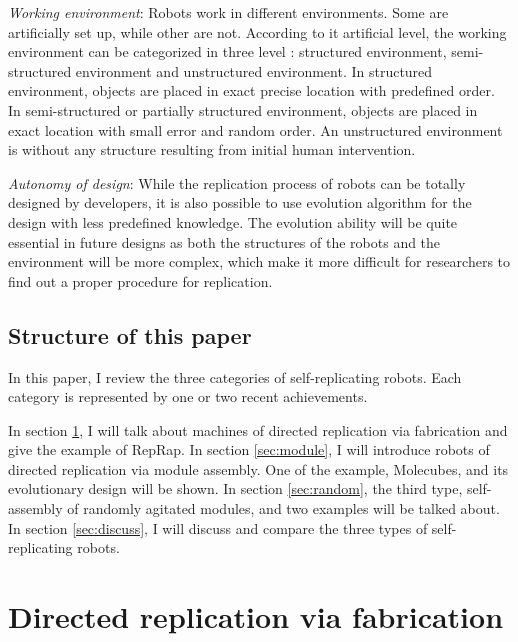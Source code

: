 \documentclass[12pt,twoside]{article}
\theoremstyle{plain}
\theoremstyle{definition}
\theoremstyle{remark}
\newcommand{\TODO}[1]{\marginpar{\emph{\small{{\bf TODO: } #1}}}}
\newcommand{\etal}{\textit{et al.}}
\begin{document}
\emph{Working environment}: Robots work in different environments. Some are artificially set up, while other are not. According to it artificial level, the working environment can be categorized in three level\cite{lee_robotic_2007} : structured environment, semi-structured environment and unstructured environment. In structured environment, objects are placed in exact precise location with predefined order. In semi-structured or partially structured environment, objects are placed in exact location with small error and random order. An unstructured environment is without any structure resulting from initial human intervention.
  
\emph{Autonomy of design}: While the replication process of robots can be totally designed by developers, it is also possible to use evolution algorithm for the design with less predefined knowledge. The evolution ability will be quite essential in future designs as both the structures of the robots and the environment will be more complex, which make it more difficult for researchers to find out a proper procedure for replication.

% 

\subsection{Structure of this paper}
In this paper, I review the three categories of self-replicating robots. Each category is represented by one or two recent achievements. 

In section \ref{sec:fabri}, I will talk about machines of directed replication via fabrication and give the example of RepRap. In section \ref{sec:module}, I will introduce robots of directed replication via module assembly. One of the example, Molecubes, and its evolutionary design will be shown. In section \ref{sec:random}, the third type, self-assembly of randomly agitated modules, and two examples will be talked about. In section \ref{sec:discuss}, I will discuss and compare the three types of self-replicating robots.

\section{Directed replication via fabrication}
\label{sec:fabri}
\end{document}
